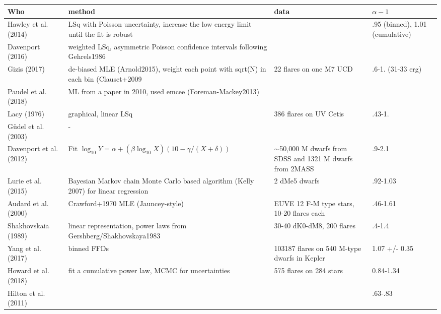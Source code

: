 
\begin{tabular}{lL{6cm}L{4cm}l}
\hline\hline
                      Who &                                                                                  method &                                                          data &      $\alpha-1$ \\
\hline
  Hawley et al. (2014)    &    LSq with Poisson uncertainty, increase the low energy limit until the fit is robust  &                                                               &     .95 (binned), 1.01 (cumulative)      \\
  Davenport (2016)        &            weighted LSq, asymmetric Poisson confidence intervals following Gehrels1986  &                                                               &                 \\
  Gizis  (2017)           &    de-biased MLE (Arnold2015), weight each point with sqrt(N) in each bin (Clauset+2009 &                                                              22 flares on one M7 UCD &   .6-1. (31-33 erg)              \\
  Paudel et al. (2018)    &                               ML from a paper in 2010, used emcee (Foreman-Mackey2013)  &                                                               &                 \\
  Lacy (1976)             &                                                                  graphical, linear LSq  &                                        386 flares on UV Cetis &         .43-1.  \\
  Güdel et al.(2003)      &      -                                                                                   &                                                               &                 \\
  Davenport et al. (2012) &              Fit $\log_{10} Y = \alpha + (\beta \log_{10} X)(10 -\gamma /(X+\delta) )$  &  $\sim$50,000 M dwarfs from SDSS and 1321 M dwarfs from 2MASS &          .9-2.1 \\
  Lurie et al. (2015)     &   Bayesian Markov chain Monte Carlo based algorithm (Kelly 2007) for linear regression  &                                                2 dMe5 dwarfs  &        .92-1.03 \\
  Audard et al. (2000)    &                                                      Crawford+1970 MLE (Jauncey-style)  &                    EUVE 12 F-M type stars, 10-20 flares each  &        .46-1.61 \\
  Shakhovskaia (1989)     &                      linear representation, power laws from Gershberg/Shakhovskaya1983  &                                     30-40 dK0-dM8, 200 flares &          .4-1.4 \\
  Yang et al. (2017)      &                                                                            binned FFDs  &                 103187 flares on 540 M-type dwarfs in Kepler  &   1.07 +/- 0.35 \\
  Howard et al. (2018)    & fit a cumulative power law, MCMC for uncertainties &575 flares on 284 stars & 0.84-1.34\\
  Hilton et al. (2011) &&&.63-.83\\ 
\bottomrule
\end{tabular}
